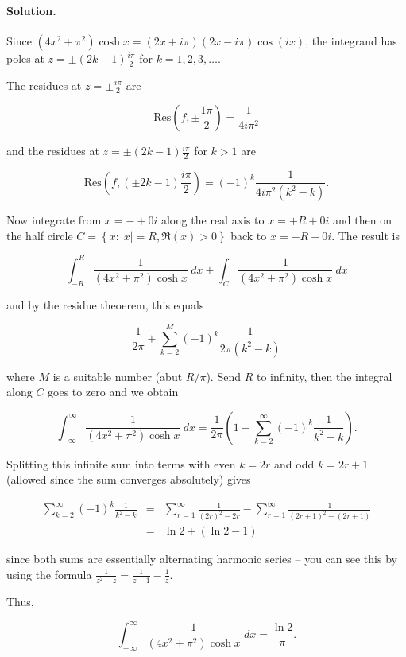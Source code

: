 
\paragraph{Solution.}

Since $\left(4x^2+\pi^2\right)\cosh x=\left(2x+i\pi\right)\left(2x-i\pi\right)\cos\left(ix\right)$, the integrand has poles at $z=\pm\left(2k-1\right)\frac{i\pi}{2}$ for $k=1,2,3,\dots$.

The residues at $z=\pm\frac{i\pi}{2}$ are

\[\mbox{Res}\left(f,\pm\frac{1\pi}{2}\right)=\frac{1}{4i\pi^2}\]

and the residues at $z=\pm\left(2k-1\right)\frac{i\pi}{2}$ for $k>1$ are

\[\mbox{Res}\left(f,\left(\pm2k-1\right)\frac{i\pi}{2}\right)=\left(-1\right)^k\frac{1}{4i\pi^2\left(k^2-k\right)}.\]

Now integrate from $x=-+0i$ along the real axis to $x=+R+0i$ and then on the half circle $C=\left\{x:\left|x\right|=R,\Re\left(x\right)>0\right\}$ back to $x=-R+0i$. The result is

\[\int_{-R}^R\frac{1}{\left(4x^2+\pi^2\right)\cosh x}~dx+\int_C\frac{1}{\left(4x^2+\pi^2\right)\cosh x}~dx\]

and by the residue theoerem, this equals

\[\frac{1}{2\pi}+\sum_{k=2}^M\left(-1\right)^k\frac{1}{2\pi\left(k^2-k\right)}\]

where $M$ is a suitable number (abut $R/\pi$). Send $R$ to infinity, then the integral along $C$ goes to zero and we obtain

\[\int_{-\infty}^\infty\frac{1}{\left(4x^2+\pi^2\right)\cosh x}~dx=\frac{1}{2\pi}\left(1+\sum_{k=2}^\infty\left(-1\right)^k\frac{1}{k^2-k}\right).\]

Splitting this infinite sum into terms with even $k=2r$ and odd $k=2r+1$ (allowed since the sum converges absolutely) gives

\begin{eqnarray*}
	\sum_{k=2}^\infty\left(-1\right)^k\frac{1}{k^2-k}&=&\sum_{r=1}^\infty\frac{1}{\left(2r\right)^2-2r}-\sum_{r=1}^\infty\frac{1}{\left(2r+1\right)^2-\left(2r+1\right)}\\
	&=&\ln2+\left(\ln2-1\right)
\end{eqnarray*}

since both sums are essentially alternating harmonic series -- you can see this by using the formula $\frac{1}{z^2-z}=\frac{1}{z-1}-\frac{1}{z}$.

Thus,

\[\int_{-\infty}^\infty\frac{1}{\left(4x^2+\pi^2\right)\cosh x}~dx=\frac{\ln2}{\pi}.\]

